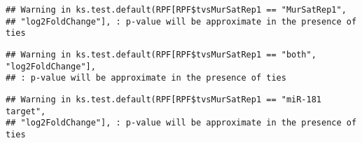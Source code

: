 \documentclass[
]{article}
\newenvironment{Shaded}{\begin{snugshade}}{\end{snugshade}}
\newcommand{\FunctionTok}[1]{\textcolor[rgb]{0.13,0.29,0.53}{\textbf{#1}}}
\newcommand{\NormalTok}[1]{#1}
\newcommand{\OtherTok}[1]{\textcolor[rgb]{0.56,0.35,0.01}{#1}}
\newcommand{\SpecialCharTok}[1]{\textcolor[rgb]{0.81,0.36,0.00}{\textbf{#1}}}
\newcommand{\StringTok}[1]{\textcolor[rgb]{0.31,0.60,0.02}{#1}}
\begin{document}
\begin{verbatim}
## Warning in ks.test.default(RPF[RPF$tvsMurSatRep1 == "MurSatRep1",
## "log2FoldChange"], : p-value will be approximate in the presence of ties
\end{verbatim}

\begin{Shaded}
\end{Shaded}

\begin{verbatim}
## Warning in ks.test.default(RPF[RPF$tvsMurSatRep1 == "both", "log2FoldChange"],
## : p-value will be approximate in the presence of ties
\end{verbatim}

\begin{Shaded}
\end{Shaded}

\begin{verbatim}
## Warning in ks.test.default(RPF[RPF$tvsMurSatRep1 == "miR-181 target",
## "log2FoldChange"], : p-value will be approximate in the presence of ties
\end{verbatim}
\end{document}
